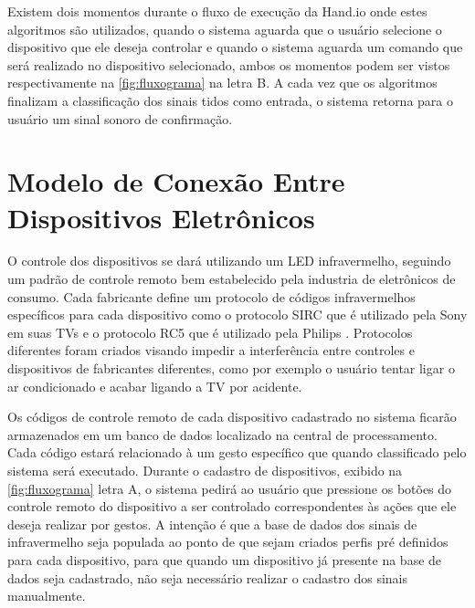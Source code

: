 Existem dois momentos durante o fluxo de execução da Hand.io onde estes algoritmos são utilizados, quando o sistema aguarda que o usuário selecione o dispositivo que ele deseja controlar e quando o sistema aguarda um comando que será realizado no dispositivo selecionado, ambos os momentos podem ser vistos respectivamente na \autoref{fig:fluxograma} na letra B. A cada vez que os algoritmos finalizam a classificação dos sinais tidos como entrada, o sistema retorna para o usuário um sinal sonoro de confirmação. 




\section{Modelo de Conexão Entre Dispositivos Eletrônicos}

O controle dos dispositivos se dará utilizando um LED infravermelho, seguindo um padrão de controle remoto bem estabelecido pela industria de eletrônicos de consumo. Cada fabricante define um protocolo de códigos infravermelhos específicos para cada dispositivo como o protocolo SIRC que é utilizado pela Sony em suas TVs \cite{sirc} e o protocolo RC5 que é utilizado pela Philips \cite{rc5}. Protocolos diferentes foram criados visando impedir a interferência entre controles e dispositivos de fabricantes diferentes, como por exemplo o usuário tentar ligar o ar condicionado e acabar ligando a TV por acidente.

Os códigos de controle remoto de cada dispositivo cadastrado no sistema ficarão armazenados em um banco de dados localizado na central de processamento. Cada código estará relacionado à um gesto específico que quando classificado pelo sistema será executado. Durante o cadastro de dispositivos, exibido na \autoref{fig:fluxograma} letra A, o sistema pedirá ao usuário que pressione os botões do controle remoto do dispositivo a ser controlado correspondentes às ações que ele deseja realizar por gestos. A intenção é que a base de dados dos sinais de infravermelho seja populada ao ponto de que sejam criados perfis pré definidos para cada dispositivo, para que quando um dispositivo já presente na base de dados seja cadastrado, não seja necessário realizar o cadastro dos sinais manualmente. 


